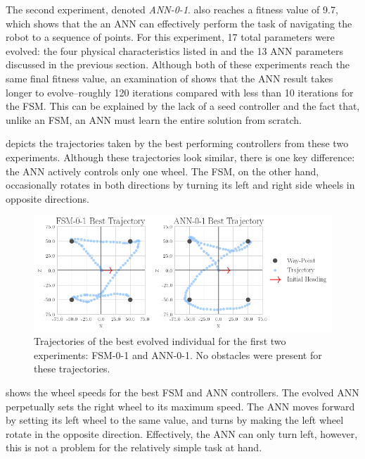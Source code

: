 The second experiment, denoted \emph{ANN-0-1}. also reaches a fitness value of 9.7, which shows that the an ANN can effectively perform the task of navigating the robot to a sequence of points.
%
For this experiment, 17 total parameters were evolved: the four physical characteristics listed in  and the 13 ANN parameters discussed in the previous section.
%
Although both of these experiments reach the same final fitness value, an examination of  shows that the ANN result takes longer to evolve--roughly 120 iterations compared with less than 10 iterations for the FSM.
%
This can be explained by the lack of a seed controller and the fact that, unlike an FSM, an ANN must learn the entire solution from scratch.


 depicts the trajectories taken by the best performing controllers from these two experiments.
%
Although these trajectories look similar, there is one key difference: the ANN actively controls only one wheel. The FSM, on the other hand, occasionally rotates in both directions by turning its left and right side wheels in opposite directions.


\begin{figure}[!ht]
    \centering

    \includegraphics[width=\columnwidth]{figures/4-results/0-1-best_trajectories.png}

    \caption{Trajectories of the best evolved individual for the first two experiments: FSM-0-1 and ANN-0-1. No obstacles were present for these trajectories.}
    \label{fig:0-1-best-trajectories}
\end{figure}


 shows the wheel speeds for the best FSM and ANN controllers.
%
The evolved ANN perpetually sets the right wheel to its maximum speed.
%
The ANN moves forward by setting its left wheel to the same value, and turns by making the left wheel rotate in the opposite direction.
%
Effectively, the ANN can only turn left, however, this is not a problem for the relatively simple task at hand.



